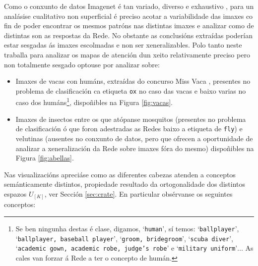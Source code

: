 Como o conxunto de datos Imagenet é tan variado, diverso e exhaustivo \cite{imagenet}, para un analásise cualitativo non superficial é preciso acotar a  variabilidade das imaxes co fin de poder encontrar os mesmos patróns nas distintas imaxes e analizar como de distintas son as respostas da Rede. No obstante as conclusións extraídas poderían estar sesgadas ás imaxes escolmadas e non ser xeneralizables. Polo tanto neste traballa para analizar os mapas de atención dun xeito relativamente preciso pero non totalmente sesgado optouse por analizar sobre:
\begin{itemize}
				\item Imaxes de vacas con humáns, extraídas do concurso Miss Vaca \cite{miss_vaca}, presentes no problema de clasificación ca etiqueta \texttt{ox} no caso das vacas e baixo varias no caso dos humáns\footnote{Se ben ningunha destas é clase, digamos, `\texttt{human}', sí temos: `\texttt{ballplayer}', `\texttt{ballplayer, baseball player}', `\texttt{groom, bridegroom}', `\texttt{scuba diver}', `\texttt{academic gown, academic robe, judge's robe}' e `\texttt{military uniform}'$\dots$ As cales van forzar á Rede a ter o concepto de humán.}, dispoñibles na Figura \ref{fig:vacas}.
				\item Imaxes de insectos entre os que atópanse mosquitos (presentes no problema de clasificación ó que foron adestradas as Redes baixo a etiqueta de \texttt{fly}) e velutinas (ausentes no conxunto de datos, pero que ofrecen a oportunidade de analizar a xeneralización da Rede sobre imaxes fóra do mesmo) dispoñibles na Figura \ref{fig:abellas}.
\end{itemize}

Nas visualizacións apreciáse como as diferentes cabezas atenden a conceptos semánticamente distintos, propiedade resultado da ortogonalidade dos distintos espazos $U_{[K]}$, ver Sección \ref{sec:crate}. En particular obsérvanse os seguintes conceptos:

